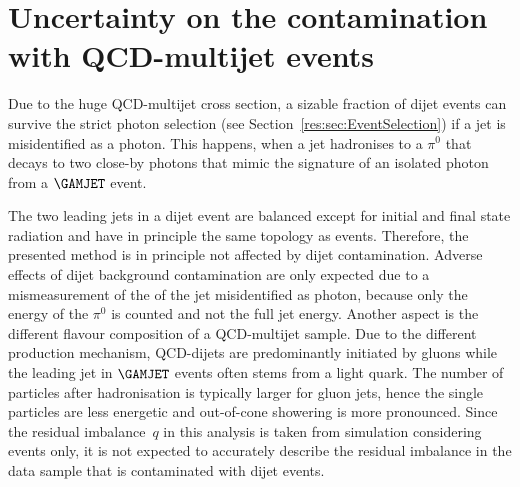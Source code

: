 \section*{Uncertainty on the contamination with QCD-multijet events}
Due to the huge QCD-multijet cross section, a sizable fraction of dijet events can survive the strict photon selection (see Section~\ref{res:sec:EventSelection}) if a jet is misidentified as a photon.
This happens, when \eg a jet hadronises to a $\pi^0$ that decays to two close-by photons that mimic the signature of an isolated photon from a $\GAMJET$ event.

The two leading jets in a dijet event are balanced except for initial and final state radiation and have in principle the same topology as \GAMJET events.
Therefore, the presented method is in principle not affected by dijet contamination.
Adverse effects of dijet background contamination are only expected due to a mismeasurement of the \pt of the jet misidentified as photon, because only the energy of the $\pi^0$ is counted and not the full jet energy.
Another aspect is the different flavour composition of a QCD-multijet sample. 
Due to the different production mechanism, QCD-dijets are predominantly initiated by gluons while the leading jet in $\GAMJET$ events often stems from a light quark.
The number of particles after hadronisation is typically larger for gluon jets, hence the single particles are less energetic and out-of-cone showering is more pronounced.
Since the residual imbalance~$q$ in this analysis is taken from simulation considering \GAMJET events only, it is not expected to accurately describe the residual imbalance in the data sample that is contaminated with dijet events.

